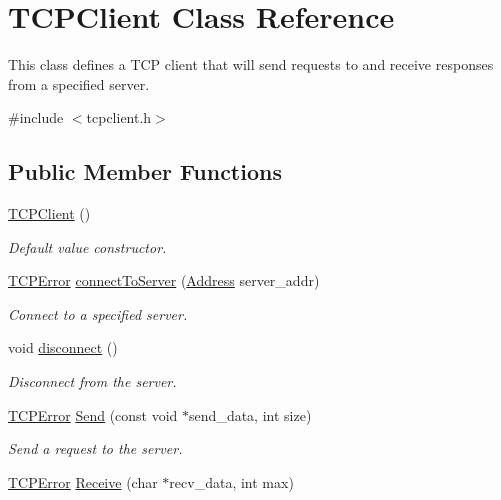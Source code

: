 \hypertarget{classTCPClient}{\section{T\-C\-P\-Client Class Reference}
\label{classTCPClient}
}


This class defines a T\-C\-P client that will send requests to and receive responses from a specified server.  




{\ttfamily \#include $<$tcpclient.\-h$>$}

\subsection*{Public Member Functions}
\begin{DoxyCompactItemize}
\item 
\hyperlink{classTCPClient_ad37bba4f2ebcc899b9871656802dcbe9}{T\-C\-P\-Client} ()
\begin{DoxyCompactList}\small\item\em Default value constructor. \end{DoxyCompactList}\item 
\hyperlink{tcpclient_8h_ab36b81f0daebbad95a533ea9951ee569}{T\-C\-P\-Error} \hyperlink{classTCPClient_adb1706d816b7810d28ef9eeab77a423b}{connect\-To\-Server} (\hyperlink{classAddress}{Address} server\-\_\-addr)
\begin{DoxyCompactList}\small\item\em Connect to a specified server. \end{DoxyCompactList}\item 
void \hyperlink{classTCPClient_aeef43b15ef57aefead37ff7300ebc779}{disconnect} ()
\begin{DoxyCompactList}\small\item\em Disconnect from the server. \end{DoxyCompactList}\item 
\hyperlink{tcpclient_8h_ab36b81f0daebbad95a533ea9951ee569}{T\-C\-P\-Error} \hyperlink{classTCPClient_a23a640eac58e631288cdeb479416e0ed}{Send} (const void $\ast$send\-\_\-data, int size)
\begin{DoxyCompactList}\small\item\em Send a request to the server. \end{DoxyCompactList}\item 
\hyperlink{tcpclient_8h_ab36b81f0daebbad95a533ea9951ee569}{T\-C\-P\-Error} \hyperlink{classTCPClient_aa070f44fa48f948931b2c49e31b5a149}{Receive} (char $\ast$recv\-\_\-data, int max)

\end{DoxyCompactItemize}
